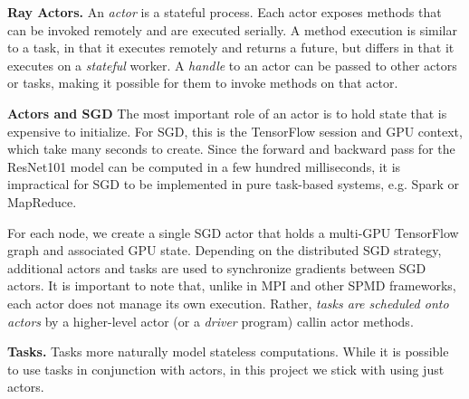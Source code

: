 \documentclass{article}
\begin{document}
{\bf Ray Actors.} An \emph{actor} is a stateful process. Each actor exposes methods that
can be invoked remotely and are executed serially.
A method execution is similar to a task, in that it executes remotely and returns a future, but differs in that it executes on
a {\em stateful} worker. A {\em handle} to an actor can be passed to other actors or
tasks, making it possible for them to invoke methods on that actor.

\textbf{Actors and SGD}
The most important role of an actor is to hold state that is expensive to initialize. For SGD, this is the TensorFlow session and GPU context, which take many seconds to create. Since the forward and backward pass for the ResNet101 model can be computed in a few hundred milliseconds, it is impractical for SGD to be implemented in pure task-based systems, e.g. Spark or MapReduce.

For each node, we create a single SGD actor that holds a multi-GPU TensorFlow graph and associated GPU state. Depending on the distributed SGD strategy, additional actors and tasks are used to synchronize gradients between SGD actors. It is important to note that, unlike in MPI and other SPMD frameworks, each actor does not manage its own execution. Rather, \textit{tasks are scheduled onto actors} by a higher-level actor (or a \textit{driver} program) callin actor methods.

{\bf Tasks.} Tasks more naturally model stateless computations. While it is possible to use tasks in conjunction with actors, in this project we stick with using just actors.

\end{document}
